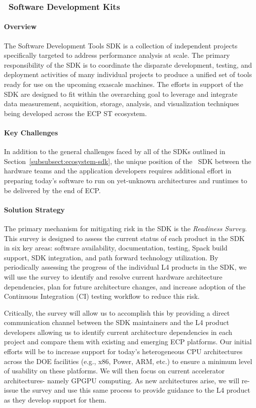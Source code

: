 \subsubsection{ \tools\ Software Development Kits} 

\paragraph{Overview}
The Software Development Tools SDK is a collection of independent projects specifically targeted to address performance analysis at scale. The primary responsibility of the SDK is to coordinate the disparate development, testing, and deployment activities of many individual projects to produce a unified set of tools ready for use on the upcoming exascale machines. The efforts in support of the SDK are designed to fit within the overarching goal to leverage and integrate data measurement, acquisition, storage, analysis, and visualization techniques being developed across the ECP ST ecosystem.


\paragraph{Key Challenges}
In addition to the general challenges faced by all of the SDKs outlined in Section~\ref{subsubsect:ecosystem-sdk}, the unique position of the \tools\ SDK between the hardware teams and the application developers requires additional effort in preparing today’s software to run on yet-unknown architectures and runtimes to be delivered by the end of ECP.

\paragraph{Solution Strategy}
The primary mechanism for mitigating risk in the SDK is the \textit{Readiness Survey}. This survey is designed to assess the current status of each product in the SDK in six key areas: software availability, documentation, testing, Spack build support, SDK integration, and path forward technology utilization. By periodically assessing the progress of the individual L4 products in the SDK, we will use the survey to identify and resolve current hardware architecture dependencies, plan for future architecture changes, and increase adoption of the Continuous Integration (CI) testing workflow to reduce this risk.

Critically, the survey will allow us to accomplish this by providing a direct communication channel between the SDK maintainers and the L4 product developers allowing us to identify current architecture dependencies in each project and compare them with existing and emerging ECP platforms. Our initial efforts will be to increase support for today’s heterogeneous CPU architectures across the DOE facilities (e.g., x86, Power, ARM, etc.) to ensure a minimum level of usability on these platforms. We will then focus on current accelerator architectures- namely GPGPU computing. As new architectures arise, we will re-issue the survey and use this same process to provide guidance to the L4 product as they develop support for them.

